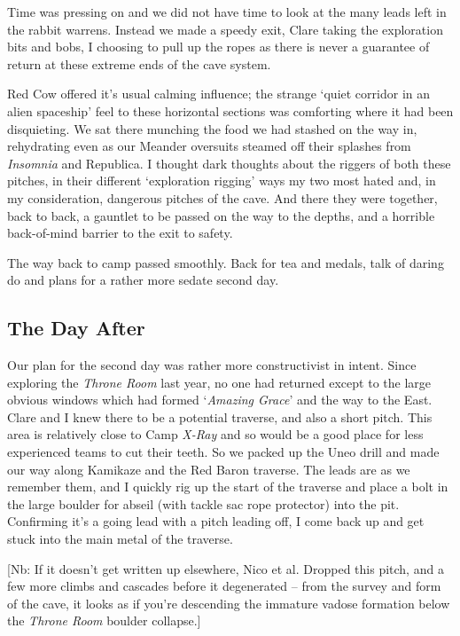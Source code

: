 Time was pressing on and we did not have time to look at the many leads
left in the rabbit warrens. Instead we made a speedy exit, Clare taking
the exploration bits and bobs, I choosing to pull up the ropes as there
is never a guarantee of return at these extreme ends of the cave system.

Red Cow offered it's usual calming influence; the strange `quiet
corridor in an alien spaceship' feel to these horizontal sections was
comforting where it had been disquieting. We sat there munching the food
we had stashed on the way in, rehydrating even as our Meander oversuits
steamed off their splashes from \emph{Insomnia} and Republica. I thought
dark thoughts about the riggers of both these pitches, in their
different `exploration rigging' ways my two most hated and, in my
consideration, dangerous pitches of the cave. And there they were
together, back to back, a gauntlet to be passed on the way to the
depths, and a horrible back-of-mind barrier to the exit to safety.

The way back to camp passed smoothly. Back for tea and medals, talk of
daring do and plans for a rather more sedate second day.

\hypertarget{the-day-after}{%
\subsection{The Day After}\label{the-day-after}}

Our plan for the second day was rather more constructivist in intent.
Since exploring the \emph{Throne Room} last year, no one had returned
except to the large obvious windows which had formed `\emph{Amazing
Grace}' and the way to the East. Clare and I knew there to be a
potential traverse, and also a short pitch. This area is relatively
close to Camp \emph{X-Ray} and so would be a good place for less
experienced teams to cut their teeth. So we packed up the Uneo drill and
made our way along Kamikaze and the Red Baron traverse. The leads are as
we remember them, and I quickly rig up the start of the traverse and
place a bolt in the large boulder for abseil (with tackle sac rope
protector) into the pit. Confirming it's a going lead with a pitch
leading off, I come back up and get stuck into the main metal of the
traverse.

{[}Nb: If it doesn't get written up elsewhere, Nico et al. Dropped this
pitch, and a few more climbs and cascades before it degenerated -- from
the survey and form of the cave, it looks as if you're descending the
immature vadose formation below the \emph{Throne Room} boulder
collapse.{]}

